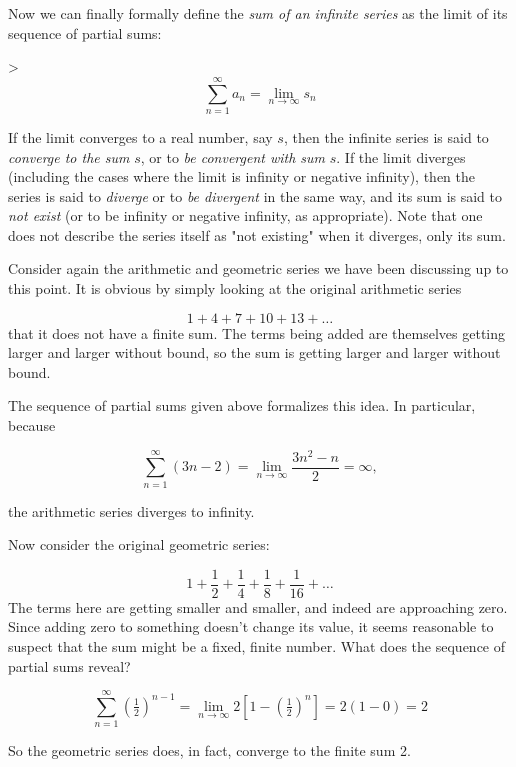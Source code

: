 Now we can finally formally define the \textit{sum of an infinite series} as the limit of its sequence of partial sums:



> $$\sum _{n=1}^{\infty} a _n=\lim _{n\to\infty}s _n$$



If the limit converges to a real number, say $s$, then the infinite series is said to \textit{converge to the sum} $s$, or to \textit{be convergent with sum} $s$. If the limit diverges (including the cases where the limit is infinity or negative infinity), then the series is said to \textit{diverge} or to \textit{be divergent} in the same way, and its sum is said to \textit{not exist} (or to be infinity or negative infinity, as appropriate). Note that one does not describe the series itself as "not existing" when it diverges, only its sum.



Consider again the arithmetic and geometric series we have been discussing up to this point. It is obvious by simply looking at the original arithmetic series



$$1+4+7+10+13+\dots$$ that it does not have a finite sum. The terms being added are themselves getting larger and larger without bound, so the sum is getting larger and larger without bound.



The sequence of partial sums given above formalizes this idea. In particular, because



$$\sum _{n=1}^{\infty} (3n-2) = \lim _{n\to\infty} \frac{3n^2-n}{2} = \infty,$$

the arithmetic series diverges to infinity.



Now consider the original geometric series:



$$1+\frac{1}{2}+\frac{1}{4}+\frac{1}{8}+\frac{1}{16}+\ldots$$ The terms here are getting smaller and smaller, and indeed are approaching zero. Since adding zero to something doesn't change its value, it seems reasonable to suspect that the sum might be a fixed, finite number. What does the sequence of partial sums reveal?



$$\sum _{n=1}^{\infty} (\tfrac{1}{2})^{n-1} = \lim _{n\to\infty} 2[1-(\tfrac{1}{2})^n] = 2(1-0)=2$$

So the geometric series does, in fact, converge to the finite sum 2.



